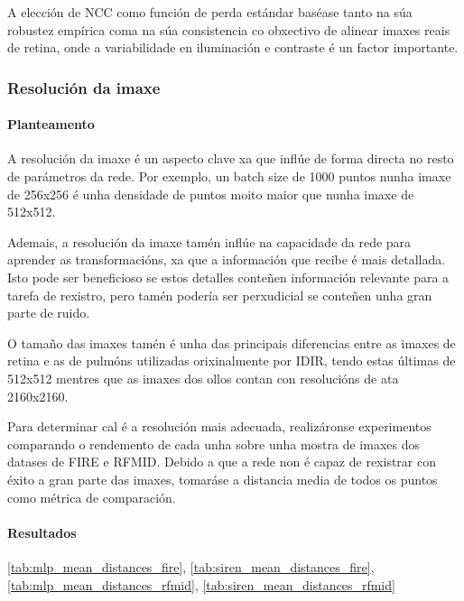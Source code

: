 A elección de NCC como función de perda estándar baséase tanto na súa robustez empírica coma na súa consistencia co obxectivo de alinear imaxes reais de retina, onde a variabilidade en iluminación e contraste é un factor importante.

\subsubsection{Resolución da imaxe}
\label{subsubsec:Resolución da imaxe}

\paragraph{Planteamento}
\label{par:Planteamento-resolution}

A resolución da imaxe é un aspecto clave xa que inflúe de forma directa no resto de parámetros da rede.
Por exemplo, un batch size de 1000 puntos nunha imaxe de 256x256 é unha densidade de puntos moito maior que nunha imaxe de 512x512.

Ademais, a resolución da imaxe tamén inflúe na capacidade da rede para aprender as transformacións, xa que a información que recibe é mais detallada. 
Isto pode ser beneficioso se estos detalles conteñen información relevante para a tarefa de rexistro, pero tamén podería ser perxudicial se conteñen unha gran parte de ruido.

O tamaño das imaxes tamén é unha das principais diferencias entre as imaxes de retina e as de pulmóns utilizadas orixinalmente por IDIR, tendo estas últimas de 512x512 mentres que as imaxes dos ollos contan con resolucións de ata 2160x2160.

Para determinar cal é a resolución mais adecuada, realizáronse experimentos comparando o rendemento de cada unha sobre unha mostra de imaxes dos datases de FIRE e RFMID.
Debido a que a rede non é capaz de rexistrar con éxito a gran parte das imaxes, tomaráse a distancia media de todos os puntos como métrica de comparación.

\paragraph{Resultados}
\label{par:Resultados-resolution}

\ref{tab:mlp_mean_distances_fire}, \ref{tab:siren_mean_distances_fire}, \ref{tab:mlp_mean_distances_rfmid}, \ref{tab:siren_mean_distances_rfmid}

